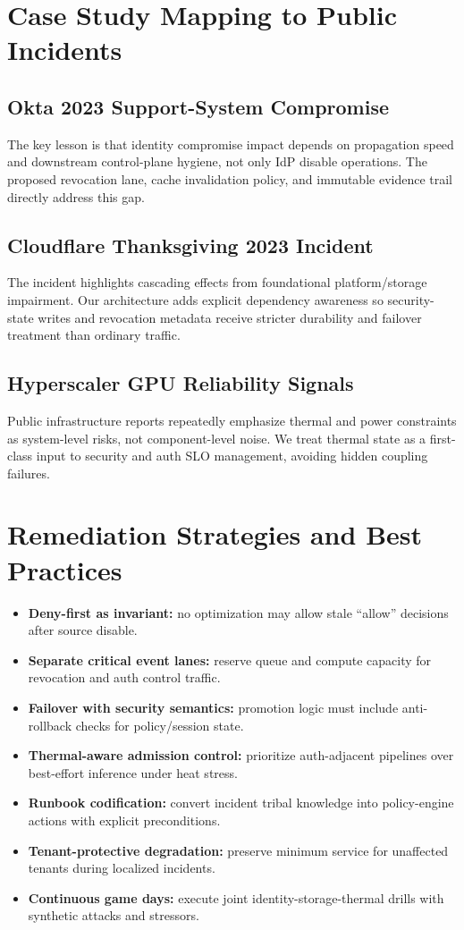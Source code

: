 \documentclass[12pt]{article}
\begin{document}
\section{Case Study Mapping to Public Incidents}
\subsection{Okta 2023 Support-System Compromise}
The key lesson is that identity compromise impact depends on propagation speed and downstream control-plane hygiene, not only IdP disable operations. The proposed revocation lane, cache invalidation policy, and immutable evidence trail directly address this gap.

\subsection{Cloudflare Thanksgiving 2023 Incident}
The incident highlights cascading effects from foundational platform/storage impairment. Our architecture adds explicit dependency awareness so security-state writes and revocation metadata receive stricter durability and failover treatment than ordinary traffic.

\subsection{Hyperscaler GPU Reliability Signals}
Public infrastructure reports repeatedly emphasize thermal and power constraints as system-level risks, not component-level noise. We treat thermal state as a first-class input to security and auth SLO management, avoiding hidden coupling failures.

\section{Remediation Strategies and Best Practices}
\begin{itemize}
  \item \textbf{Deny-first as invariant:} no optimization may allow stale ``allow'' decisions after source disable.
  \item \textbf{Separate critical event lanes:} reserve queue and compute capacity for revocation and auth control traffic.
  \item \textbf{Failover with security semantics:} promotion logic must include anti-rollback checks for policy/session state.
  \item \textbf{Thermal-aware admission control:} prioritize auth-adjacent pipelines over best-effort inference under heat stress.
  \item \textbf{Runbook codification:} convert incident tribal knowledge into policy-engine actions with explicit preconditions.
  \item \textbf{Tenant-protective degradation:} preserve minimum service for unaffected tenants during localized incidents.
  \item \textbf{Continuous game days:} execute joint identity-storage-thermal drills with synthetic attacks and stressors.
\end{itemize}
\end{document}

